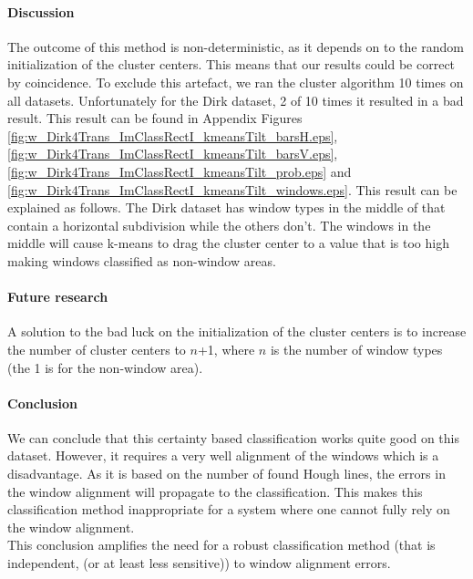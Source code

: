 \paragraph{Discussion}  %
The outcome of this method is non-deterministic, as it depends on to the random
initialization of the cluster centers. This means that our results could be
correct by coincidence.  To exclude this artefact, we ran the cluster algorithm
10 times on all datasets. Unfortunately for the Dirk dataset, 2 of 10 times it 
resulted in a bad result. This result can be found in Appendix
Figures \ref{fig:w_Dirk4Trans_ImClassRectI_kmeansTilt_barsH.eps},
\ref{fig:w_Dirk4Trans_ImClassRectI_kmeansTilt_barsV.eps},
\ref{fig:w_Dirk4Trans_ImClassRectI_kmeansTilt_prob.eps} and
\ref{fig:w_Dirk4Trans_ImClassRectI_kmeansTilt_windows.eps}.
This result can be explained as follows. The Dirk dataset has window types in the
middle of that contain a horizontal subdivision while the others don't.
The windows in the middle will cause k-means to drag the cluster center to a
value that is too high making windows classified as non-window areas.

\paragraph{Future research}
A solution to the bad luck on the initialization of the cluster centers 
is to increase the number of cluster centers to $n$+1, 
where $n$ is the number of window types (the 1 is for the non-window area).


\paragraph{Conclusion}
We can conclude that this certainty based classification works quite good on
this dataset.  However, it requires a very well alignment of the windows which
is a disadvantage.  As it is based on the number of found Hough lines, the
errors in the window alignment will propagate to the classification.  This
makes this classification method inappropriate for a system where one cannot
fully rely on the window alignment.  \\
This conclusion amplifies the need for a robust classification method (that is
independent, (or at least less sensitive)) to window alignment errors.


